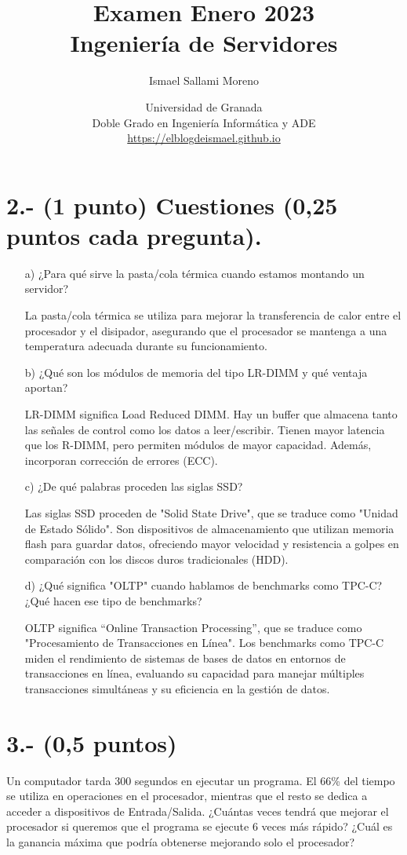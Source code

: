 \documentclass[a4paper,12pt]{article}
\title{\Huge Examen Enero 2023\vspace{0.5cm} \\ \Large Ingeniería de Servidores}
\author{Ismael Sallami Moreno}
\date{\small Universidad de Granada\\ Doble Grado en Ingeniería Informática y ADE\\ \url{https://elblogdeismael.github.io}}
\begin{document}
\maketitle
\thispagestyle{fancy}

\vspace{1cm}

\section*{2.- (1 punto) Cuestiones (0,25 puntos cada pregunta).}
\begin{enumerate}
    \item[a)] ¿Para qué sirve la pasta/cola térmica cuando estamos montando un servidor?
    
    La pasta/cola térmica se utiliza para mejorar la transferencia de calor entre el procesador y el disipador, asegurando que el procesador se mantenga a una temperatura adecuada durante su funcionamiento.

    \item[b)] ¿Qué son los módulos de memoria del tipo LR-DIMM y qué ventaja aportan?
    
    LR-DIMM significa Load Reduced DIMM. Hay un buffer que almacena tanto las señales de control como los datos a leer/escribir. Tienen mayor latencia que los R-DIMM, pero permiten módulos de mayor capacidad. Además, incorporan corrección de errores (ECC).
    \item[c)] ¿De qué palabras proceden las siglas SSD?
    
    Las siglas SSD proceden de "Solid State Drive", que se traduce como "Unidad de Estado Sólido". Son dispositivos de almacenamiento que utilizan memoria flash para guardar datos, ofreciendo mayor velocidad y resistencia a golpes en comparación con los discos duros tradicionales (HDD).

    \item[d)] ¿Qué significa "OLTP" cuando hablamos de benchmarks como TPC-C? ¿Qué hacen ese tipo de benchmarks?
    
    OLTP significa ``Online Transaction Processing'', que se traduce como "Procesamiento de Transacciones en Línea". Los benchmarks como TPC-C miden el rendimiento de sistemas de bases de datos en entornos de transacciones en línea, evaluando su capacidad para manejar múltiples transacciones simultáneas y su eficiencia en la gestión de datos.
\end{enumerate}


\section*{3.- (0,5 puntos)}
Un computador tarda 300 segundos en ejecutar un programa. El 66\% del tiempo se utiliza en operaciones en el procesador, mientras que el resto se dedica a acceder a dispositivos de Entrada/Salida. ¿Cuántas veces tendrá que mejorar el procesador si queremos que el programa se ejecute 6 veces más rápido? ¿Cuál es la ganancia máxima que podría obtenerse mejorando solo el procesador?\\\\
\end{document}
